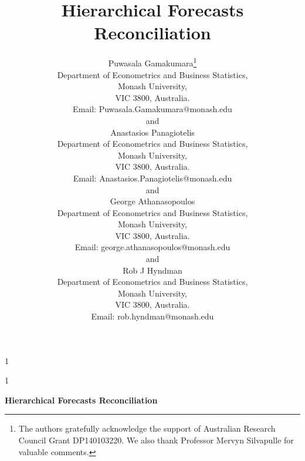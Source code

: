\documentclass[12pt]{article}
\newcommand{\blind}{1}
\theoremstyle{definition}
\begin{document}
	
	
	
	\def\spacingset#1{\renewcommand{\baselinestretch}%
		{#1}\small\normalsize} \spacingset{1}
	
	
	
	\blind
	{
		\title{\bf Hierarchical Forecasts Reconciliation}
		\author{Puwasala Gamakumara\thanks{
				The authors gratefully acknowledge the support of Australian Research Council Grant DP140103220.  We also thank Professor Mervyn Silvapulle for valuable comments.}\hspace{.2cm}\\
			Department of Econometrics and Business Statistics,\\
			Monash University,\\ VIC 3800, Australia.\\
			Email: Puwasala.Gamakumara@monash.edu \\
			and \\
			Anastasios Panagiotelis\\
			Department of Econometrics and Business Statistics,\\
			Monash University,\\ VIC 3800, Australia.\\
			Email: Anastasios.Panagiotelis@monash.edu \\
			and \\
			George Athanasopoulos\\
			Department of Econometrics and Business Statistics,\\
			Monash University,\\ VIC 3800, Australia.\\
			Email: george.athanasopoulos@monash.edu \\
			and \\
			Rob J Hyndman\\
			Department of Econometrics and Business Statistics,\\
			Monash University,\\ VIC 3800, Australia.\\
			Email: rob.hyndman@monash.edu \\}
		\maketitle
	} \fi
	
	\blind
	{
		\bigskip
		\bigskip
		\bigskip
		\begin{center}
			{\LARGE\bf Hierarchical Forecasts Reconciliation}
		\end{center}
		\medskip
	} \fi
	
\end{document}
